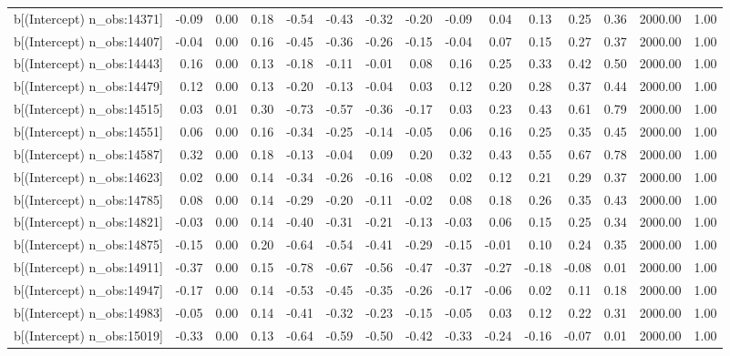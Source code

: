 \begin{table}[ht]
\begin{tabular}{rrrrrrrrrrrrrrr}
  b[(Intercept) n\_obs:14371] & -0.09 & 0.00 & 0.18 & -0.54 & -0.43 & -0.32 & -0.20 & -0.09 & 0.04 & 0.13 & 0.25 & 0.36 & 2000.00 & 1.00 \\ 
  b[(Intercept) n\_obs:14407] & -0.04 & 0.00 & 0.16 & -0.45 & -0.36 & -0.26 & -0.15 & -0.04 & 0.07 & 0.15 & 0.27 & 0.37 & 2000.00 & 1.00 \\ 
  b[(Intercept) n\_obs:14443] & 0.16 & 0.00 & 0.13 & -0.18 & -0.11 & -0.01 & 0.08 & 0.16 & 0.25 & 0.33 & 0.42 & 0.50 & 2000.00 & 1.00 \\ 
  b[(Intercept) n\_obs:14479] & 0.12 & 0.00 & 0.13 & -0.20 & -0.13 & -0.04 & 0.03 & 0.12 & 0.20 & 0.28 & 0.37 & 0.44 & 2000.00 & 1.00 \\ 
  b[(Intercept) n\_obs:14515] & 0.03 & 0.01 & 0.30 & -0.73 & -0.57 & -0.36 & -0.17 & 0.03 & 0.23 & 0.43 & 0.61 & 0.79 & 2000.00 & 1.00 \\ 
  b[(Intercept) n\_obs:14551] & 0.06 & 0.00 & 0.16 & -0.34 & -0.25 & -0.14 & -0.05 & 0.06 & 0.16 & 0.25 & 0.35 & 0.45 & 2000.00 & 1.00 \\ 
  b[(Intercept) n\_obs:14587] & 0.32 & 0.00 & 0.18 & -0.13 & -0.04 & 0.09 & 0.20 & 0.32 & 0.43 & 0.55 & 0.67 & 0.78 & 2000.00 & 1.00 \\ 
  b[(Intercept) n\_obs:14623] & 0.02 & 0.00 & 0.14 & -0.34 & -0.26 & -0.16 & -0.08 & 0.02 & 0.12 & 0.21 & 0.29 & 0.37 & 2000.00 & 1.00 \\ 
  b[(Intercept) n\_obs:14785] & 0.08 & 0.00 & 0.14 & -0.29 & -0.20 & -0.11 & -0.02 & 0.08 & 0.18 & 0.26 & 0.35 & 0.43 & 2000.00 & 1.00 \\ 
  b[(Intercept) n\_obs:14821] & -0.03 & 0.00 & 0.14 & -0.40 & -0.31 & -0.21 & -0.13 & -0.03 & 0.06 & 0.15 & 0.25 & 0.34 & 2000.00 & 1.00 \\ 
  b[(Intercept) n\_obs:14875] & -0.15 & 0.00 & 0.20 & -0.64 & -0.54 & -0.41 & -0.29 & -0.15 & -0.01 & 0.10 & 0.24 & 0.35 & 2000.00 & 1.00 \\ 
  b[(Intercept) n\_obs:14911] & -0.37 & 0.00 & 0.15 & -0.78 & -0.67 & -0.56 & -0.47 & -0.37 & -0.27 & -0.18 & -0.08 & 0.01 & 2000.00 & 1.00 \\ 
  b[(Intercept) n\_obs:14947] & -0.17 & 0.00 & 0.14 & -0.53 & -0.45 & -0.35 & -0.26 & -0.17 & -0.06 & 0.02 & 0.11 & 0.18 & 2000.00 & 1.00 \\ 
  b[(Intercept) n\_obs:14983] & -0.05 & 0.00 & 0.14 & -0.41 & -0.32 & -0.23 & -0.15 & -0.05 & 0.03 & 0.12 & 0.22 & 0.31 & 2000.00 & 1.00 \\ 
  b[(Intercept) n\_obs:15019] & -0.33 & 0.00 & 0.13 & -0.64 & -0.59 & -0.50 & -0.42 & -0.33 & -0.24 & -0.16 & -0.07 & 0.01 & 2000.00 & 1.00 \\ 

\end{tabular}
\end{table}

